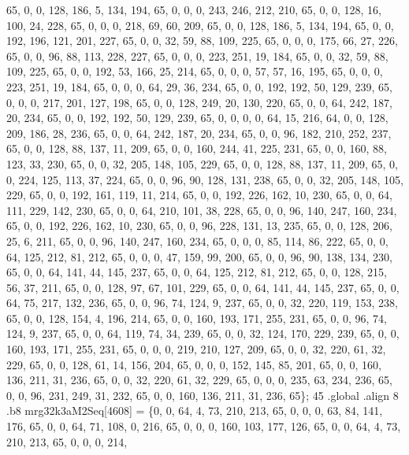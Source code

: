 \begin{DoxyCode}
       65, 0, 0, 128, 186, 5, 134, 194, 65, 0, 0, 0, 243, 246, 212, 210, 65, 0, 0, 128, 16, 100, 24, 228, 65, 0, 0,
       0, 218, 69, 60, 209, 65, 0, 0, 128, 186, 5, 134, 194, 65, 0, 0, 192, 196, 121, 201, 227, 65, 0, 0, 32, 59,
       88, 109, 225, 65, 0, 0, 0, 175, 66, 27, 226, 65, 0, 0, 96, 88, 113, 228, 227, 65, 0, 0, 0, 223, 251, 19,
       184, 65, 0, 0, 32, 59, 88, 109, 225, 65, 0, 0, 192, 53, 166, 25, 214, 65, 0, 0, 0, 57, 57, 16, 195, 65, 0, 0,
       0, 223, 251, 19, 184, 65, 0, 0, 0, 64, 29, 36, 234, 65, 0, 0, 192, 192, 50, 129, 239, 65, 0, 0, 0, 217, 201,
       127, 198, 65, 0, 0, 128, 249, 20, 130, 220, 65, 0, 0, 64, 242, 187, 20, 234, 65, 0, 0, 192, 192, 50, 129,
       239, 65, 0, 0, 0, 0, 64, 15, 216, 64, 0, 0, 128, 209, 186, 28, 236, 65, 0, 0, 64, 242, 187, 20, 234, 65, 0, 0,
       96, 182, 210, 252, 237, 65, 0, 0, 128, 88, 137, 11, 209, 65, 0, 0, 160, 244, 41, 225, 231, 65, 0, 0, 160,
       88, 123, 33, 230, 65, 0, 0, 32, 205, 148, 105, 229, 65, 0, 0, 128, 88, 137, 11, 209, 65, 0, 0, 224, 125, 113,
       37, 224, 65, 0, 0, 96, 90, 128, 131, 238, 65, 0, 0, 32, 205, 148, 105, 229, 65, 0, 0, 192, 161, 119, 11,
       214, 65, 0, 0, 192, 226, 162, 10, 230, 65, 0, 0, 64, 111, 229, 142, 230, 65, 0, 0, 64, 210, 101, 38, 228, 65,
       0, 0, 96, 140, 247, 160, 234, 65, 0, 0, 192, 226, 162, 10, 230, 65, 0, 0, 96, 228, 131, 13, 235, 65, 0, 0,
       128, 206, 25, 6, 211, 65, 0, 0, 96, 140, 247, 160, 234, 65, 0, 0, 0, 85, 114, 86, 222, 65, 0, 0, 64, 125,
       212, 81, 212, 65, 0, 0, 0, 47, 159, 99, 200, 65, 0, 0, 96, 90, 138, 134, 230, 65, 0, 0, 64, 141, 44, 145, 237,
       65, 0, 0, 64, 125, 212, 81, 212, 65, 0, 0, 128, 215, 56, 37, 211, 65, 0, 0, 128, 97, 67, 101, 229, 65, 0, 0,
       64, 141, 44, 145, 237, 65, 0, 0, 64, 75, 217, 132, 236, 65, 0, 0, 96, 74, 124, 9, 237, 65, 0, 0, 32, 220,
       119, 153, 238, 65, 0, 0, 128, 154, 4, 196, 214, 65, 0, 0, 160, 193, 171, 255, 231, 65, 0, 0, 96, 74, 124, 9,
       237, 65, 0, 0, 64, 119, 74, 34, 239, 65, 0, 0, 32, 124, 170, 229, 239, 65, 0, 0, 160, 193, 171, 255, 231,
       65, 0, 0, 0, 219, 210, 127, 209, 65, 0, 0, 32, 220, 61, 32, 229, 65, 0, 0, 128, 61, 14, 156, 204, 65, 0, 0, 0,
       152, 145, 85, 201, 65, 0, 0, 160, 136, 211, 31, 236, 65, 0, 0, 32, 220, 61, 32, 229, 65, 0, 0, 0, 235, 63,
       234, 236, 65, 0, 0, 96, 231, 249, 31, 232, 65, 0, 0, 160, 136, 211, 31, 236, 65\};
45 .global .align 8 .b8 mrg32k3aM2Seq[4608] = \{0, 0, 64, 4, 73, 210, 213, 65, 0, 0, 0, 63, 84, 141, 176, 65,
       0, 0, 64, 71, 108, 0, 216, 65, 0, 0, 0, 160, 103, 177, 126, 65, 0, 0, 64, 4, 73, 210, 213, 65, 0, 0, 0, 214,

\end{DoxyCode}
